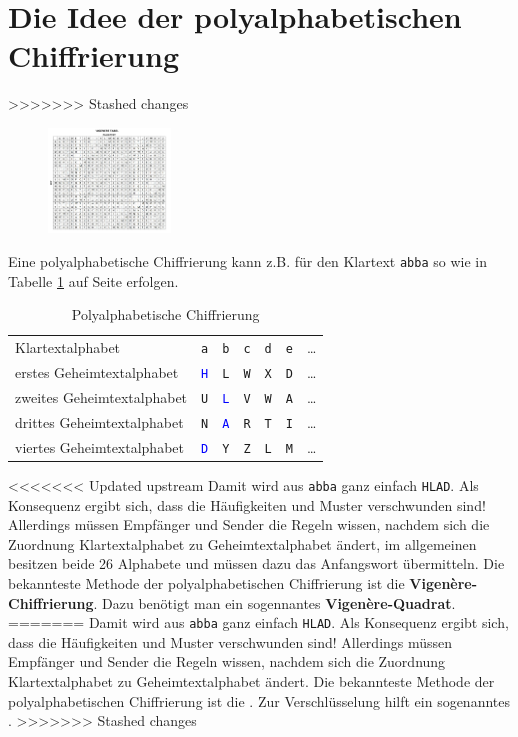 \documentclass[%
<<<<<<< Updated upstream
11pt,%
twoside,%
titlepage,%
german,%
headsepline%
]{scrartcl}
\newcommand{\spaltenheight}{\rule{0mm}{3ex}}
\newcommand{\spaltensep}{\\[1ex]}
\begin{document}
\section{Die Idee der polyalphabetischen Chiffrierung}

>>>>>>> Stashed changes
\begin{figure}
\vspace{-22pt}
  \begin{center}
    \includegraphics[width=0.29\textwidth]{pictures/vigeneretable}
  \end{center}
\vspace{-22pt}
\end{figure}
Eine polyalphabetische Chiffrierung kann z.B. für den Klartext \texttt{abba} so wie in Tabelle \ref{polyalph} auf Seite \pageref{polyalph} erfolgen.
\begin{table}
\begin{tabular}{lcccccl}
\spaltenheight Klartextalphabet & \texttt{a}& \texttt{b}& \texttt{c}& \texttt{d}& \texttt{e}& \dots\spaltensep
\spaltenheight erstes Geheimtextalphabet & \textcolor{blue}{\texttt{H}}& \texttt{L}& \texttt{W}& \texttt{X}& \texttt{D}& \dots\spaltensep
\spaltenheight zweites Geheimtextalphabet & \texttt{U}& \textcolor{blue}{\texttt{L}}& \texttt{V}& \texttt{W}& \texttt{A}& \dots\spaltensep
\spaltenheight drittes Geheimtextalphabet & \texttt{N}& \textcolor{blue}{\texttt{A}}& \texttt{R}& \texttt{T}& \texttt{I}& \dots\spaltensep
\spaltenheight viertes Geheimtextalphabet & \textcolor{blue}{\texttt{D}}& \texttt{Y}& \texttt{Z}& \texttt{L}& \texttt{M}& \dots\spaltensep
\end{tabular}
\caption{Polyalphabetische Chiffrierung}\label{polyalph}
\end{table}
<<<<<<< Updated upstream
Damit wird aus \texttt{abba} ganz einfach \texttt{HLAD}. Als Konsequenz ergibt sich, dass die Häufigkeiten und Muster verschwunden sind! Allerdings müssen Empfänger und Sender die Regeln wissen, nachdem sich die Zuordnung Klartextalphabet zu Geheimtextalphabet ändert, im allgemeinen besitzen beide 26 Alphabete und müssen dazu das Anfangswort über\-mit\-teln. Die bekannteste Methode der polyalphabetischen Chiffrierung ist die \textbf{Vigen\`ere-Chiffrierung}. Dazu benötigt man ein sogennantes \textbf{Vigen\`ere-Quadrat}.
=======
Damit wird aus \texttt{abba} ganz einfach \texttt{HLAD}. Als Konsequenz ergibt sich, dass die Häufigkeiten und Muster verschwunden sind! Allerdings müssen Empfänger und Sender die Regeln wissen, nachdem sich die Zuordnung Klartextalphabet zu Geheimtextalphabet ändert. Die bekannteste Methode der polyalphabetischen Chiffrierung ist die . Zur Verschlüsselung hilft ein sogenanntes .
>>>>>>> Stashed changes
\end{document}
